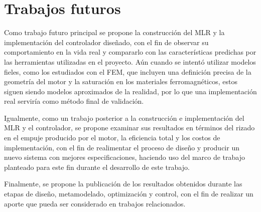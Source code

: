 \section{Trabajos futuros}

Como trabajo futuro principal se propone la construcción del MLR y la implementación del controlador diseñado, con el fin de observar su comportamiento en la vida real y compararlo con las características predichas por las herramientas utilizadas en el proyecto. Aún cuando se intentó utilizar modelos fieles, como los estudiados con el FEM, que incluyen una definición precisa de la geometría del motor y la saturación en los materiales ferromagnéticos, estos siguen siendo modelos aproximados de la realidad, por lo que una implementación real serviría como método final de validación. 

Igualmente, como un trabajo posterior a la construcción e implementación del MLR y el controlador, se propone examinar sus resultados en términos del rizado en el empuje producido por el motor, la eficiencia total y los costos de implementación, con el fin de realimentar el proceso de diseño y producir un nuevo sistema con mejores especificaciones, haciendo uso del marco de trabajo planteado para este fin durante el desarrollo de este trabajo.

Finalmente, se propone la publicación de los resultados obtenidos durante las etapas de diseño, metamodelado, optimización y control, con el fin de realizar un aporte que pueda ser considerado en trabajos relacionados.